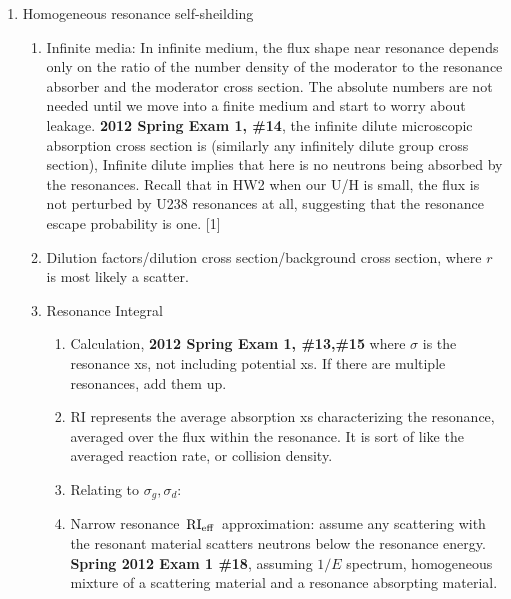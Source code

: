 \documentclass{school-22.211-notes}
\begin{document}
\begin{enumerate}
\item Homogeneous resonance self-sheilding
  \begin{enumerate}
    \item Infinite media: In infinite medium, the flux shape near resonance depends only on the ratio of the number density of the moderator to the resonance absorber and the moderator cross section. The absolute numbers are not needed until we move into a finite medium and start to worry about leakage. \textbf{2012 Spring Exam 1, \#14}, the infinite dilute microscopic absorption cross section is (similarly any infinitely dilute group cross section), 
      Infinite dilute implies that here is no neutrons being absorbed by the resonances. Recall that in HW2 when our U/H is small, the flux is not perturbed by U238 resonances at all, suggesting that the resonance escape probability is one. [1]
    \item Dilution factors/dilution cross section/background cross section, 
      where $r$ is most likely a scatter. 

    \item Resonance Integral
      \begin{enumerate}
      \item Calculation, \textbf{2012 Spring Exam 1, \#13,\#15}
        where $\sigma$ is the resonance xs, not including potential xs. If there are multiple resonances, add them up. 

      \item RI represents the average absorption xs characterizing the resonance, averaged over the flux within the resonance. It is sort of like the averaged reaction rate, or collision density. 
        
      \item Relating to $\sigma_g, \sigma_d$: 

      \item Narrow resonance $\left. \mathrm{RI}_{\mathrm{eff}} \right.$ approximation: assume any scattering with the resonant material scatters neutrons below the resonance energy. 
        \textbf{Spring 2012 Exam 1 \#18}, assuming $1/E$ spectrum, homogeneous mixture of a scattering material and a resonance absorpting material. 
        

\end{enumerate}
\end{enumerate}
\end{enumerate}
\end{document}
